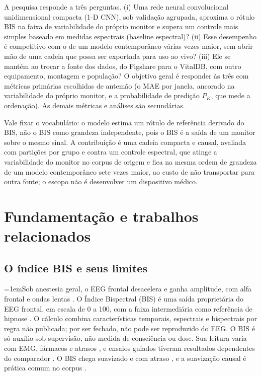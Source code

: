 \documentclass[12pt]{article}
\begin{document}
A pesquisa responde a três perguntas. (i) Uma rede neural convolucional unidimensional compacta (1-D CNN), sob validação agrupada, aproxima o rótulo BIS na faixa de variabilidade do próprio monitor e supera um controle mais simples baseado em medidas espectrais (baseline espectral)? (ii) Esse desempenho é competitivo com o de um modelo contemporâneo várias vezes maior, sem abrir mão de uma cadeia que possa ser exportada para uso ao vivo? (iii) Ele se mantém ao trocar a fonte dos dados, do Figshare para o VitalDB, com outro equipamento, montagem e população? O objetivo geral é responder às três com métricas primárias escolhidas de antemão (o MAE por janela, ancorado na variabilidade do próprio monitor, e a probabilidade de predição $P_K$, que mede a ordenação). As demais métricas e análises são secundárias.

Vale fixar o vocabulário: o modelo estima um rótulo de referência derivado do BIS, não o BIS como grandeza independente, pois o BIS é a saída de um monitor sobre o mesmo sinal. A contribuição é uma cadeia compacta e causal, avaliada com partições por grupo e contra um controle espectral, que atinge a variabilidade do monitor no corpus de origem e fica na mesma ordem de grandeza de um modelo contemporâneo sete vezes maior, ao custo de não transportar para outra fonte; o escopo não é desenvolver um dispositivo médico.





\section{Fundamentação e trabalhos relacionados}

\subsection{O índice BIS e seus limites}

\begingroup\emergencystretch=1em\relax Sob anestesia geral, o EEG frontal desacelera e ganha amplitude, com alfa frontal e ondas lentas \cite{purdon2015}. O Índice Bispectral (BIS) é uma saída proprietária do EEG frontal, em escala de 0 a 100, com a faixa intermediária como referência de hipnose \cite{johansen2000}. O cálculo combina características temporais, espectrais e bispectrais por regra não publicada; por ser fechado, não pode ser reproduzido do EEG. O BIS é só auxílio sob supervisão, não medida de consciência ou dose. Sua leitura varia com EMG, fármacos e atrasos \cite{schuller2015,hans2005,pilge2006}, e ensaios guiados tiveram resultados dependentes do comparador \cite{baware,bunaware,bagrecall}. O BIS chega suavizado e com atraso \cite{pilge2006}, e a suavização causal é prática comum no corpus \cite{sukriti2026}.
\par\endgroup
\end{document}
